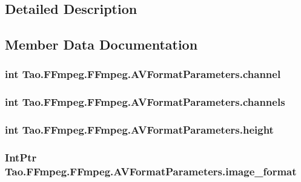 \subsection{Detailed Description}


\subsection{Member Data Documentation}
\hypertarget{struct_tao_1_1_f_fmpeg_1_1_f_fmpeg_1_1_a_v_format_parameters_a8076b0f1a7eb2c2821c3154ad4919865}{
\subsubsection[{channel}]{\setlength{\rightskip}{0pt plus 5cm}int {\bf Tao.FFmpeg.FFmpeg.AVFormatParameters.channel}}}
\label{struct_tao_1_1_f_fmpeg_1_1_f_fmpeg_1_1_a_v_format_parameters_a8076b0f1a7eb2c2821c3154ad4919865}
\hypertarget{struct_tao_1_1_f_fmpeg_1_1_f_fmpeg_1_1_a_v_format_parameters_a0f4cf44371ee3add9aed581ce67b1b6d}{
\subsubsection[{channels}]{\setlength{\rightskip}{0pt plus 5cm}int {\bf Tao.FFmpeg.FFmpeg.AVFormatParameters.channels}}}
\label{struct_tao_1_1_f_fmpeg_1_1_f_fmpeg_1_1_a_v_format_parameters_a0f4cf44371ee3add9aed581ce67b1b6d}
\hypertarget{struct_tao_1_1_f_fmpeg_1_1_f_fmpeg_1_1_a_v_format_parameters_aed79d18d2c4a12176b2ff927d98d219a}{
\subsubsection[{height}]{\setlength{\rightskip}{0pt plus 5cm}int {\bf Tao.FFmpeg.FFmpeg.AVFormatParameters.height}}}
\label{struct_tao_1_1_f_fmpeg_1_1_f_fmpeg_1_1_a_v_format_parameters_aed79d18d2c4a12176b2ff927d98d219a}
\hypertarget{struct_tao_1_1_f_fmpeg_1_1_f_fmpeg_1_1_a_v_format_parameters_a1fd9ac926ac7eb6f74868e3177d6e633}{
\subsubsection[{image\_\-format}]{\setlength{\rightskip}{0pt plus 5cm}IntPtr {\bf Tao.FFmpeg.FFmpeg.AVFormatParameters.image\_\-format}}}
